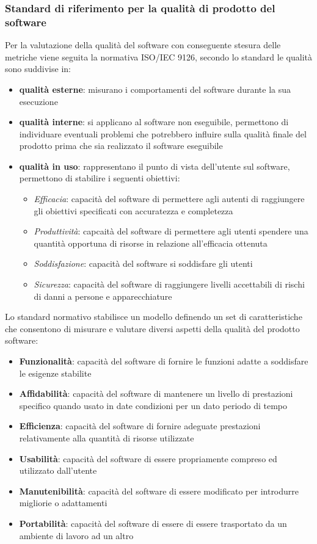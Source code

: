\subsubsection{Standard di riferimento per la qualità di prodotto del software}
Per la valutazione della qualità del software con conseguente stesura delle metriche viene seguita la normativa ISO/IEC 9126, secondo lo standard le qualità sono suddivise in:
\begin{itemize}
    \item \textbf{qualità esterne}: misurano i comportamenti del software durante la sua esecuzione
    \item \textbf{qualità interne}: si applicano al software non eseguibile, permettono di individuare eventuali problemi che potrebbero influire sulla qualità finale del prodotto prima che sia realizzato il software eseguibile
    \item \textbf{qualità in uso}: rappresentano il punto di vista dell'utente sul software, permettono di stabilire i seguenti obiettivi:
    \begin{itemize}
        \item \textsl{Efficacia}: capacità del software di permettere agli autenti di raggiungere gli obiettivi specificati con accuratezza e completezza
        \item \textsl{Produttività}: capcaità del software di permettere agli utenti spendere una quantità opportuna di risorse in relazione all'efficacia ottenuta
        \item \textsl{Soddisfazione}: capacità del software si soddisfare gli utenti
        \item \textsl{Sicurezza}: capacità del software di raggiungere livelli accettabili di rischi di danni a persone e apparecchiature
    \end{itemize}
\end{itemize}

Lo standard normativo stabilisce un modello definendo un set di caratteristiche che consentono di misurare e valutare diversi aspetti della qualità del prodotto software:
\begin{itemize}
    \item \textbf{Funzionalità}: capacità del software di fornire le funzioni adatte a soddisfare le esigenze stabilite
    \item \textbf{Affidabilità}: capacità del software di mantenere un livello di prestazioni specifico quando usato in date condizioni per un dato periodo di tempo
    \item \textbf{Efficienza}: capacità del software di fornire adeguate prestazioni relativamente alla quantità di risorse utilizzate
    \item \textbf{Usabilità}: capacità del software di essere propriamente compreso ed utilizzato dall'utente 
    \item \textbf{Manutenibilità}: capacità del software di essere modificato per introdurre migliorie o adattamenti
    \item \textbf{Portabilità}: capacità del software di essere di essere trasportato da un ambiente di lavoro ad un altro
\end{itemize}
